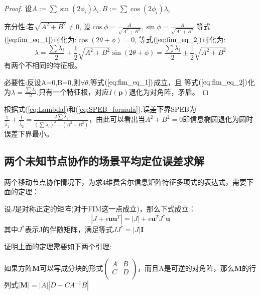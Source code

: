\begin{proof}
设$A:=\sum\sin(2\phi_i)\lambda_i,B:=\sum\cos(2\phi_i)\lambda_i$

充分性:若$\sqrt{A^2+B^2} \neq 0$,
设$\cos\phi=\frac{A}{\sqrt{A^2+B^2}},\sin\phi=\frac{A}{\sqrt{A^2+B^2}}$
等式$(\ref{eq:fim_eq_1})$可化为:$\cos(2\theta+\phi)=0$,
等式$(\ref{eq:fim_eq_2})$可化为:
\begin{equation}\label{eq:Lambda}
\lambda=\frac{\sum \lambda_i}{2}+\frac{1}{2}\sqrt{A^2+B^2}\sin(2\theta+\phi)=\frac{\sum \lambda_i}{2}\pm\frac{1}{2}\sqrt{A^2+B^2}
\end{equation}
有两个不相同的特征根。

必要性:反设A=0,B=0,则$\forall \theta$,等式$(\ref{eq:fim_eq_1})$成立，且
等式$(\ref{eq:fim_eq_2})$化为$\lambda=\frac{\sum \lambda_i}{2}$,只有一个特征根，对应$I(\bm{p})$退化为对角阵，矛盾。
\end{proof}
根据式(\ref{eq:Lambda})和(\ref{eq:SPEB_formula}),误差下界SPEB为$\frac{1}{\tilde{\lambda_1}}+\frac{1}{\tilde{\lambda_2}}=\frac{2\sum \lambda_i}{(\sum \lambda_i)^2-(A^2+B^2)}$，由此可以看出当$A^2+B^2=0$即信息椭圆退化为圆时误差下界最小。

\subsection{两个未知节点协作的场景平均定位误差求解}

两个移动节点协作情况下，为求4维费舍尔信息矩阵特征多项式的表达式，需要下面的定理：
\begin{theorem}\label{thm:ShenIden}
设$J$是对称正定的矩阵(对于FIM这一点成立)，那么下式成立：
\begin{equation}\label{eq:ShenIden}
|J+\epsilon \bm{u}\bm{u}^T|=|J|+\epsilon \bm{u}^TJ^*\bm{u}
\end{equation}
其中$J^*$表示J的伴随矩阵，满足等式$JJ^*=|J|\bm{I}$
\end{theorem}
证明上面的定理需要如下两个引理:
\begin{lemma}\label{lemma:block}
如果方阵$\bm{M}$可以写成分块的形式$\left(\begin{array}{cc}
A&B\\
C&D\\
\end{array}\right)$，而且A是可逆的对角阵，那么$\bm{M}$的行列式$|\bm{M}|=|A||D-CA^{-1}B|$
\end{lemma}


